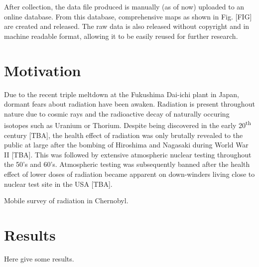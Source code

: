 \documentclass[11pt]{article}
\begin{document}
After collection, the data file produced is manually (as of now) uploaded to an online database. From this database, comprehensive maps as shown in Fig. [FIG] 
are created and released. The raw data is also released without copyright and in machine readable format, allowing it to be easily reused for further research.


\section*{Motivation}
\label{sec:motivation}

Due to the recent triple meltdown at the Fukushima Dai-ichi plant in Japan, dormant fears about radiation have been awaken.
Radiation is present throughout nature due to cosmic rays and the radioactive decay of naturally occuring isotopes such as Uranium or Thorium.
Despite being discovered in the early 20\textsuperscript{th} century [TBA], the health effect of radiation was only brutally revealed to the public at
large after the bombing of Hiroshima and Nagasaki during World War II [TBA]. This was followed by extensive atmospheric nuclear testing throughout the 50's and 60's.
Atmospheric testing was subsequently banned after the health effect of lower doses of radiation became apparent on down-winders living close to
nuclear test site in the USA [TBA].

Mobile survey of radiation in Chernobyl\cite{arvela1990mobile}.

\section*{Results}
\label{sec:results}

Here give some results.
\end{document}

